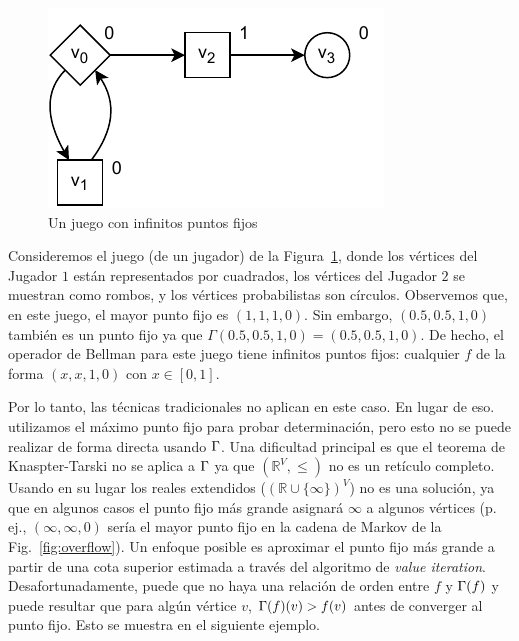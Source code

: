 \begin{figure}
\centering
\includegraphics[scale=0.9]{Figs/inf-fixpoints-horiz.pdf}
\caption{Un juego con infinitos puntos fijos} \label{fig:multiple-fixpoints}
\end{figure}

\begin{example}\label{ex:several-fixpoints} Consideremos el juego (de un jugador) de la Figura~\ref{fig:multiple-fixpoints}, donde los vértices del Jugador $1$ están representados por cuadrados, los vértices del Jugador $2$ se muestran como rombos, y los vértices probabilistas son círculos. Observemos que, en este juego, el mayor punto fijo es $(1,1,1,0)$.  Sin embargo, $(0.5,0.5,1,0)$ también es un punto fijo ya que $\Gamma(0.5,0.5,1,0) = (0.5,0.5,1,0)$.  De hecho, el operador de Bellman para este juego tiene infinitos puntos fijos: cualquier $f$ de la forma $(x,x,1,0)$ con $x\in[0,1]$.
\end{example}

Por lo tanto, las técnicas tradicionales no aplican en este caso. En lugar de eso. utilizamos el máximo punto fijo para probar determinación, pero esto no se puede realizar de forma directa usando $\Gamma$. Una dificultad principal es que el teorema de Knaspter-Tarski no se aplica a $\Gamma$ ya que $(\mathbb{R}^V, \leq)$ no es un retículo completo. Usando en su lugar los reales extendidos ($(\mathbb{R} \cup \{\infty\})^V$) no es una solución, ya que en algunos casos el punto fijo más grande asignará $\infty$ a algunos vértices (p. ej., $(\infty,\infty,0)$ sería el mayor punto fijo en la cadena de Markov de la Fig.~\ref{fig:overflow}).
Un enfoque posible es aproximar el punto fijo más grande a partir de una cota superior estimada a través del algoritmo de \emph{value iteration}. Desafortunadamente, puede que no haya una relación de orden entre $f$ y $\Gamma(f)$ y puede resultar que para algún vértice $v$, $\Gamma(f)(v)>f(v)$ antes de converger al punto fijo. Esto se muestra en el siguiente ejemplo.

